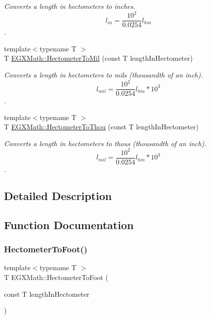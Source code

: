\begin{DoxyCompactItemize}
\begin{DoxyCompactList}\small\item\em Converts a length in hectometers to inches. \[ l_{in}= \frac{10^{2}}{0.0254} l_{hm} \]. \end{DoxyCompactList}\item 
{\footnotesize template$<$typename T $>$ }\\T \mbox{\hyperlink{group___e_g_x_math-_conversions-_length_conversions-_hectometer-_imperial_ga117bf04e7f132a33598fa098a8b7c17e}{E\+G\+X\+Math\+::\+Hectometer\+To\+Mil}} (const T length\+In\+Hectometer)
\begin{DoxyCompactList}\small\item\em Converts a length in hectometers to mils (thousandth of an inch). \[ l_{mil}= \frac{10^{2}}{0.0254} l_{hm} * 10^{3} \]. \end{DoxyCompactList}\item 
{\footnotesize template$<$typename T $>$ }\\T \mbox{\hyperlink{group___e_g_x_math-_conversions-_length_conversions-_hectometer-_imperial_gabfd81bd5bb9e8293005c23794f541a1c}{E\+G\+X\+Math\+::\+Hectometer\+To\+Thou}} (const T length\+In\+Hectometer)
\begin{DoxyCompactList}\small\item\em Converts a length in hectometers to thous (thousandth of an inch). \[ l_{mil}= \frac{10^{2}}{0.0254} l_{hm} * 10^{3} \]. \end{DoxyCompactList}\end{DoxyCompactItemize}


\subsection{Detailed Description}


\subsection{Function Documentation}
\mbox{\label{group___e_g_x_math-_conversions-_length_conversions-_hectometer-_imperial_ga8b57e6e5bef662cc96b8b7dde68659a6}} 
\subsubsection{\texorpdfstring{Hectometer\+To\+Foot()}{HectometerToFoot()}}
{\footnotesize\ttfamily template$<$typename T $>$ \\
T E\+G\+X\+Math\+::\+Hectometer\+To\+Foot (\begin{DoxyParamCaption}\item[{const T}]{length\+In\+Hectometer }\end{DoxyParamCaption})}



